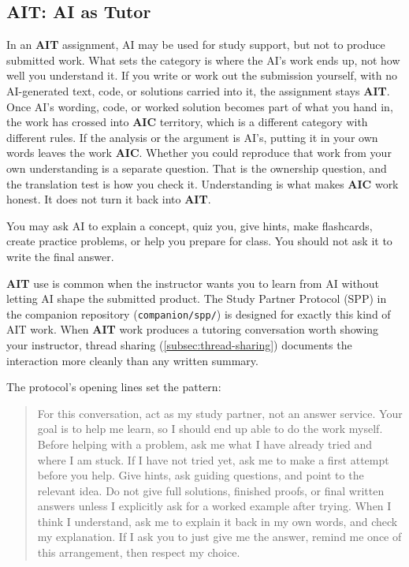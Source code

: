 \documentclass{SIAMbook2023}
\newcommand{\AIT}{\textcolor{catAIT}{\textbf{AIT}}}
\newcommand{\AIC}{\textcolor{catAIC}{\textbf{AIC}}}
\begin{document}
\subsection{\texorpdfstring{\AIT{}: AI as Tutor}{AIT: AI as Tutor}}
\label{subsec:yellow}

In an \AIT{} assignment, AI may be used for study support, but not to produce submitted work. What sets the category is where the AI's work ends up, not how well you understand it. If you write or work out the submission yourself, with no AI-generated text, code, or solutions carried into it, the assignment stays \AIT{}. Once AI's wording, code, or worked solution becomes part of what you hand in, the work has crossed into \AIC{} territory, which is a different category with different rules. If the analysis or the argument is AI's, putting it in your own words leaves the work \AIC{}. Whether you could reproduce that work from your own understanding is a separate question. That is the ownership question, and the translation test is how you check it. Understanding is what makes \AIC{} work honest. It does not turn it back into \AIT{}.

You may ask AI to explain a concept, quiz you, give hints, make flashcards, create practice problems, or help you prepare for class. You should not ask it to write the final answer.

\AIT{} use is common when the instructor wants you to learn from AI without letting AI shape the submitted product. The Study Partner Protocol (SPP) in the companion repository (\texttt{companion/spp/}) is designed for exactly this kind of AIT work. When \AIT{} work produces a tutoring conversation worth showing your instructor, thread sharing (\cref{subsec:thread-sharing}) documents the interaction more cleanly than any written summary.

The protocol's opening lines set the pattern:

\begin{quote}\small\textsf{For this conversation, act as my study partner, not an answer service. Your goal is to help me learn, so I should end up able to do the work myself. Before helping with a problem, ask me what I have already tried and where I am stuck. If I have not tried yet, ask me to make a first attempt before you help. Give hints, ask guiding questions, and point to the relevant idea. Do not give full solutions, finished proofs, or final written answers unless I explicitly ask for a worked example after trying. When I think I understand, ask me to explain it back in my own words, and check my explanation. If I ask you to just give me the answer, remind me once of this arrangement, then respect my choice.}\end{quote}
\end{document}
